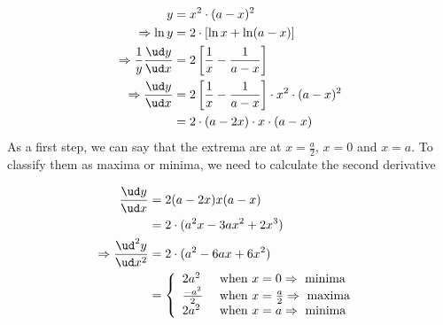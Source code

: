 \begin{solution}
  \begin{align}
     y &= x^2\cdot(a-x)^2 \\
     \Rightarrow \ln y &= 2\cdot \left[\ln x + \ln (a-x)\right] \\
     \Rightarrow \dfrac{1}{y}\dfrac{\ud y}{\ud x} &= 2\left[ \dfrac{1}{x} - \dfrac{1}{a-x}\right] \\
     \Rightarrow \dfrac{\ud y}{\ud x} &= 2\left[ \dfrac{1}{x} - \dfrac{1}{a-x}\right]
                                         \cdot x^2\cdot (a-x)^2 \\
                                      &= 2\cdot(a-2x)\cdot x \cdot (a-x)
  \end{align}
  As a first step, we can say that the extrema are at $x=\frac{a}{2}$, $x=0$ and $x=a$.
  To classify them as maxima or minima, we need to calculate the second derivative
  
  \begin{align}
     \dfrac{\ud y}{\ud x} &= 2(a-2x)x(a-x) \\
            &= 2\cdot(a^2x - 3ax^2 + 2x^3) \\
     \Rightarrow \dfrac{\ud^2 y}{\ud x^2} &= 2\cdot(a^2 - 6ax + 6x^2) \\
     &= \left\lbrace
        \begin{array}{l l}
          2a^2 & \text{ when } x = 0 \Rightarrow \text{ minima } \\
          \frac{-a^2}{2} & \text{ when } x = \frac{a}{2} \Rightarrow \text{ maxima } \\
          2a^2 & \text{ when } x = a \Rightarrow \text{ minima }
        \end{array}\right.
  \end{align}
  
\end{solution}
